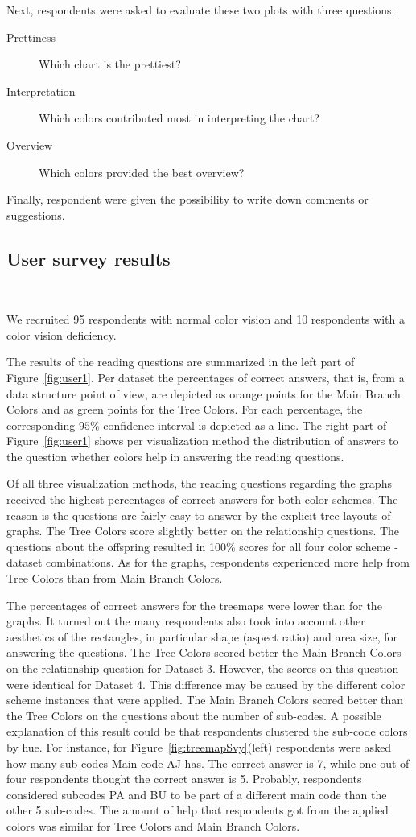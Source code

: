 \documentclass[journal]{vgtc}                %
\begin{document}
Next, respondents were asked to evaluate these two plots with three questions:
\begin{description}
\item[Prettiness] Which chart is the prettiest?
\item[Interpretation] Which colors contributed most in interpreting the chart?
\item[Overview] Which colors provided the best overview?
\end{description}
Finally, respondent were given the possibility to write down comments or suggestions.

\subsection{User survey results}~\label{secuserres}

We recruited 95 respondents with normal color vision and 10 respondents with a color vision deficiency.

The results of the reading questions are summarized in the left part of Figure~\ref{fig:user1}. Per dataset the percentages of correct answers, that is, from a data structure point of view, are depicted as orange points for the Main Branch Colors and as green points for the Tree Colors. For each percentage, the corresponding $95\%$ confidence interval is depicted as a line. The right part of Figure~\ref{fig:user1} shows per visualization method the distribution of answers to the question whether colors help in answering the reading questions.

Of all three visualization methods, the reading questions regarding the graphs received the highest percentages of correct answers for both color schemes. The reason is the questions are fairly easy to answer by the explicit tree layouts of graphs. The Tree Colors score slightly better on the relationship questions. The questions about the offspring resulted in 100\% scores for all four color scheme - dataset combinations. As for the graphs, respondents experienced more help from Tree Colors than from Main Branch Colors.


The percentages of correct answers for the treemaps were lower than for the graphs. It turned out the many respondents also took into account other aesthetics of the rectangles, in particular shape (aspect ratio) and area size, for answering the questions. The Tree Colors scored better the Main Branch Colors on the relationship question for Dataset 3. However, the scores on this question were identical for Dataset 4. This difference may be caused by the different color scheme instances that were applied. The Main Branch Colors scored better than the Tree Colors on the questions about the number of sub-codes. A possible explanation of this result could be that respondents clustered the sub-code colors by hue. For instance, for Figure~\ref{fig:treemapSvy}(left) respondents were asked how many sub-codes Main code AJ has. The correct answer is 7, while one out of four respondents thought the correct answer is 5. Probably, respondents considered subcodes PA and BU to be part of a different main code than the other 5 sub-codes. The amount of help that respondents got from the applied colors was similar for Tree Colors and Main Branch Colors.
\end{document}
